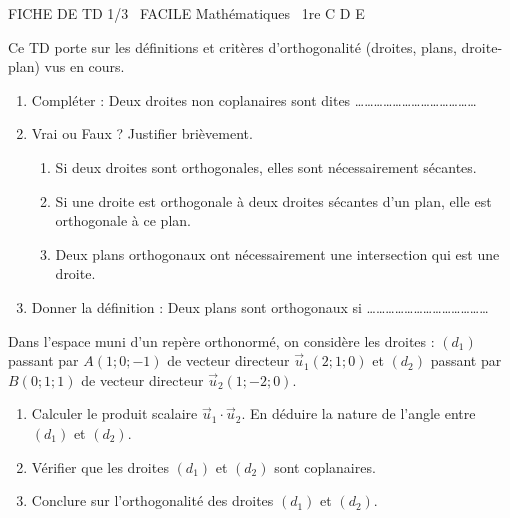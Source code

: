 \documentclass[11pt]{article}
\begin{document}
\begin{tcolorbox}[enhanced,colback=popink,colframe=popink,arc=10pt,boxrule=0pt,left=12pt,right=12pt,top=9pt,bottom=9pt]
{\color{white}\popxbold\small FICHE DE TD 1/3 \textbullet\ FACILE \hfill Mathématiques \textbullet\ 1re C D E\par}
\end{tcolorbox}
\vspace{4pt}
Ce TD porte sur les définitions et critères d'orthogonalité (droites, plans, droite-plan) vus en cours.

\begin{exercice}
\begin{enumerate}
    \item Compléter : Deux droites non coplanaires sont dites \ldots\ldots\ldots\ldots\ldots\ldots\ldots\ldots\ldots\ldots\ldots\ldots\ldots
    \item Vrai ou Faux ? Justifier brièvement.
    \begin{enumerate}
        \item Si deux droites sont orthogonales, elles sont nécessairement sécantes.
        \item Si une droite est orthogonale à deux droites sécantes d'un plan, elle est orthogonale à ce plan.
        \item Deux plans orthogonaux ont nécessairement une intersection qui est une droite.
    \end{enumerate}
    \item Donner la définition : Deux plans sont orthogonaux si \ldots\ldots\ldots\ldots\ldots\ldots\ldots\ldots\ldots\ldots\ldots\ldots\ldots
\end{enumerate}
\end{exercice}

\begin{exercice}
Dans l'espace muni d'un repère orthonormé, on considère les droites :
$(d_1)$ passant par $A(1;0;-1)$ de vecteur directeur $\vec{u}_1(2;1;0)$ et
$(d_2)$ passant par $B(0;1;1)$ de vecteur directeur $\vec{u}_2(1;-2;0)$.
\begin{enumerate}
    \item Calculer le produit scalaire $\vec{u}_1 \cdot \vec{u}_2$. En déduire la nature de l'angle entre $(d_1)$ et $(d_2)$.
    \item Vérifier que les droites $(d_1)$ et $(d_2)$ sont coplanaires.
    \item Conclure sur l'orthogonalité des droites $(d_1)$ et $(d_2)$.
\end{enumerate}
\end{exercice}
\end{document}
